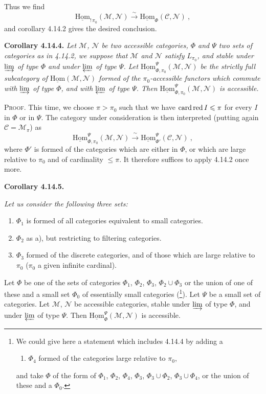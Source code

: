 \documentclass[11pt]{article}
\newcommand{\printedpage}[1]{\marginpar{\footnotesize p.~#1}}
\newcommand{\msp}[1]{\marginpar{\footnotesize [#1]}}
\newcommand{\uHom}{\underline{\mathrm{Hom}}}
\newcommand{\cardred}{\mathop{\textup{card\,red}}}
\begin{document}
\msp{page 374}

Thus we find
\[
\uHom_{!\,\pi_0}(\mathcal{M},\mathcal{N}) \xrightarrow{\ \sim\ } \uHom_{\Phi}(\mathcal{C},\mathcal{N})\ ,
\]
\printedpage{142}
and corollary 4.14.2 gives the desired conclusion.

\noindent\textbf{Corollary 4.14.4.} {\itshape Let $\mathcal{M}$, $\mathcal{N}$ be two accessible categories, $\Phi$ and $\Psi$ two sets of categories as in 4.14.2, we suppose that $\mathcal{M}$ and $\mathcal{N}$ satisfy $L_{\pi_0}$, and stable under $\varinjlim$ of type $\Phi$ and under $\varprojlim$ of type $\Psi$. Let $\uHom^{\Psi}_{\Phi,\pi_0}(\mathcal{M},\mathcal{N})$ be the strictly full subcategory of $\uHom(\mathcal{M},\mathcal{N})$ formed of the $\pi_0$-accessible functors which commute with $\varinjlim$ of type $\Phi$, and with $\varprojlim$ of type $\Psi$. Then $\uHom^{\Psi}_{\Phi,\pi_0}(\mathcal{M},\mathcal{N})$ is accessible.}

\noindent\textsc{Proof}. This time, we choose $\pi>\pi_0$ such that we have $\cardred I\leqslant\pi$ for every $I$ in $\Phi$ or in $\Psi$. The category under consideration is then interpreted (putting again $\mathcal{C}=\mathcal{M}_\pi$) as
\msp{page 375}
\[
\uHom^{\Psi}_{\Phi,\pi_0}(\mathcal{M},\mathcal{N}) \xrightarrow{\ \sim\ } \uHom^{\Psi}_{\Phi'}(\mathcal{C},\mathcal{N})\ ,
\]
where $\Phi'$ is formed of the categories which are either in $\Phi$, or which are large relative to $\pi_0$ and of cardinality $\leqslant\pi$. It therefore suffices to apply 4.14.2 once more.

\noindent\textbf{Corollary 4.14.5.} {\itshape Let us consider the following three sets:
\begin{enumerate}[leftmargin=2.5em]
\item[\textit{a)}] $\Phi_1$ is formed of all categories equivalent to small categories.
\item[\textit{b)}] $\Phi_2$ as a), but restricting to filtering categories.
\item[\textit{c)}] $\Phi_3$ formed of the discrete categories, and of those which are large relative to $\pi_0$ ($\pi_0$ a given infinite cardinal).
\end{enumerate}
\noindent Let $\Phi$ be one of the sets of categories $\Phi_1$, $\Phi_2$, $\Phi_3$, $\Phi_2\cup\Phi_3$ or the union of one of these and a small set $\Phi_0$ of essentially small categories (\footnote[165]{We could give here a statement which includes 4.14.4 by adding a
\begin{enumerate}[leftmargin=2.5em]
\item[d)] $\Phi_4$ formed of the categories large relative to $\pi_0$,
\end{enumerate}
\noindent and take $\Phi$ of the form of $\Phi_1$, $\Phi_2$, $\Phi_4$, $\Phi_3$, $\Phi_3\cup\Phi_2$, $\Phi_3\cup\Phi_4$, or the union of these and a $\Phi_0$.}). Let $\Psi$ be a small set of categories. Let $\mathcal{M}$, $\mathcal{N}$ be accessible categories, stable under $\varinjlim$ of type $\Phi$, and under $\varprojlim$ of type $\Psi$. Then $\uHom^{\Psi}_{\Phi}(\mathcal{M},\mathcal{N})$ is accessible.}
\end{document}

